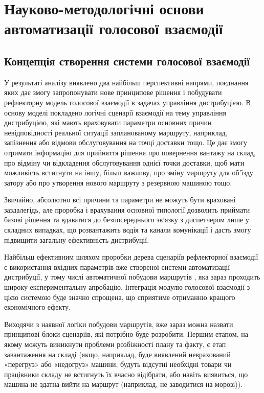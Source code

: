 \chapter{Науково-методологічні основи автоматизації голосової взаємодії} \label{chapt2}

\section{Концепція створення системи голосової взаємодії} \label{sect2_1}

У результаті аналізу виявлено два найбільш перспективні напрями, поєднання яких дає змогу запропонувати нове принципове рішення і побудувати рефлекторну модель голосової взаємодії в задачах управління дистрибуцією. В основу моделі покладено логічні сценарії взаємодії на тему управління дистрибуцією, які мають враховувати параметри основних причин невідповідності реальної ситуації запланованому маршруту, наприклад, запізнення або відмови обслуговування на точці доставки тощо. Це дає змогу отримати інформацію для прийняття рішення про повернення вантажу на склад, про відміну чи відкладення обслуговування однієї точки доставки, щоб мати можливість встигнути на іншу, більш важливу, про зміну маршруту для об’їзду затору або про утворення нового маршруту з резервною машиною тощо.

Звичайно, абсолютно всі причини та параметри не можуть бути враховані заздалегідь, але проробка і врахування основної типології дозволить приймати базові рішення та вдаватися до безпосереднього зв`язку з диспетчером лише у складних випадках, що розвантажить водія та канали комунікації і дасть змогу підвищити загальну ефективність дистрибуції.

Найбільш ефективним шляхом проробки дерева сценаріїв рефлекторної взаємодії є використання вхідних параметрів вже створеної системи автоматизації дистрибуції, у тому числі автоматичної побудови маршрутів \cite{as6}, яка зараз проходить широку експериментальну апробацію. Інтеграція модулю голосової взаємодії з цією системою буде значно спрощена, що сприятиме отриманню кращого економічного ефекту.

Виходячи з наявної логіки побудови маршрутів, вже зараз можна назвати принципові блоки сценаріїв, які потрібно буде розробити. Першим етапом, на якому можуть виникнути проблеми розбіжності плану та факту, є етап завантаження на складі (якщо, наприклад, буде виявлений неврахований «перегруз» або «недогруз» машини, будуть відсутні необхідні товари чи працівники складу не встигнуть їх вчасно відібрати, або навіть виявиться, що машина не здатна вийти на маршрут (наприклад, не заводитися на морозі)).

